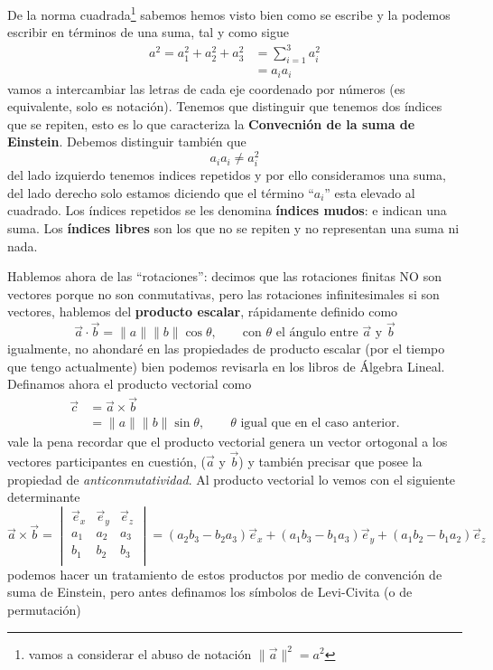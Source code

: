 \documentclass[11pt,a4paper]{article}
\begin{document}
De la norma cuadrada\footnote{vamos a considerar el abuso de notación $\|\vec{a}\|^2=a^2$} sabemos hemos visto bien como se escribe y la podemos escribir en términos de una suma, tal y como sigue
\begin{align*}
a^2=a_1^2+a_2^2+a_3^2&=\sum_{i=1}^3a_i^2\\
&=a_ia_i
\end{align*}
vamos a intercambiar las letras de cada eje coordenado por números (es equivalente, solo es notación). Tenemos que distinguir que tenemos dos índices que se repiten, esto es lo que caracteriza la \textbf{Convecnión de la suma de Einstein}. Debemos distinguir también que 
$$a_ia_i\neq a_i^2$$
del lado izquierdo tenemos indices repetidos y por ello consideramos una suma, del lado derecho solo estamos diciendo que el término “$a_i$'' esta elevado al cuadrado. Los índices repetidos se les denomina \textbf{índices mudos}: e indican una suma. Los \textbf{índices libres} son los que no se repiten y no representan una suma ni nada.

Hablemos ahora de las “rotaciones'': decimos que las rotaciones finitas NO son vectores porque no son conmutativas, pero las rotaciones infinitesimales si son vectores, hablemos del \textbf{producto escalar}, rápidamente definido como
$$\vec{a}\cdot\vec{b}=\|a\|\|b\|\cos\theta,\qquad\text{con $\theta$ el ángulo entre $\vec{a}$ y $\vec{b}$}$$
igualmente, no ahondaré en las propiedades de producto escalar (por el tiempo que tengo actualmente) bien podemos revisarla en los libros de Álgebra Lineal. Definamos ahora el producto vectorial como
\begin{align*}
\vec{c}&=\vec{a}\times\vec{b}\\
&=\|a\|\|b\|\sin\theta,\qquad\text{$\theta$ igual que en el caso anterior.}
\end{align*}
vale la pena recordar que el producto vectorial genera un vector ortogonal a los vectores participantes en cuestión, ($\vec{a}$ y $\vec{b}$) y también precisar que posee la propiedad de \emph{anticonmutatividad}. Al producto vectorial lo vemos con el siguiente determinante
$$\vec{a}\times\vec{b}=\begin{vmatrix}
\vec{e}_x & \vec{e}_y & \vec{e}_z\\
a_1 & a_2 & a_3\\
b_1 & b_2 & b_3\\
\end{vmatrix}=(a_2b_3-b_2a_3)\vec{e}_x+(a_1b_3-b_1a_3)\vec{e}_y+(a_1b_2-b_1a_2)\vec{e}_z$$
podemos hacer un tratamiento de estos productos por medio de convención de suma de Einstein, pero antes definamos los símbolos de Levi-Civita (o de permutación)
\end{document}
